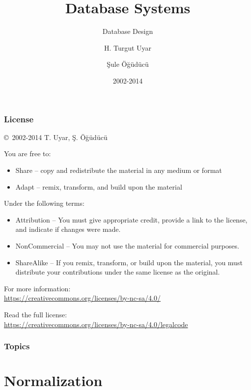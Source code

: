 \documentclass[dvipsnames]{beamer}
\title{Database Systems}
\subtitle{Database Design}
\author{H. Turgut Uyar \and Şule Öğüdücü}
\date{2002-2014}
\begin{document}
\begin{frame}
  \titlepage
\end{frame}

\begin{frame}
  \frametitle{License}

  \hfill
  \copyright~2002-2014 T. Uyar, Ş. Öğüdücü

  \vfill
  \begin{footnotesize}
    You are free to:
    \begin{itemize}
      \itemsep0em
      \item Share -- copy and redistribute the material in any medium or format
      \item Adapt -- remix, transform, and build upon the material
    \end{itemize}

    Under the following terms:
    \begin{itemize}
      \itemsep0em
      \item Attribution -- You must give appropriate credit, provide a link to
        the license, and indicate if changes were made.

      \item NonCommercial -- You may not use the material for commercial
        purposes.

      \item ShareAlike -- If you remix, transform, or build upon the material,
        you must distribute your contributions under the same license as the
        original.
    \end{itemize}
  \end{footnotesize}

  \begin{small}
    For more information:\\
    \url{https://creativecommons.org/licenses/by-nc-sa/4.0/}

    \smallskip
    Read the full license:\\
    \url{https://creativecommons.org/licenses/by-nc-sa/4.0/legalcode}
  \end{small}
\end{frame}

\begin{frame}
  \frametitle{Topics}
  \tableofcontents
\end{frame}

\section{Normalization}
\end{document}
